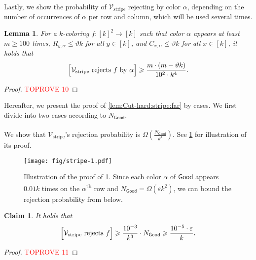 \documentclass[11pt,fleqn]{article}
\renewcommand{\geq}{\geqslant}
\renewcommand{\leq}{\leqslant}
\renewcommand{\epsilon}{\varepsilon}
\renewcommand{\theta}{\vartheta}
\newcommand{\nth}[1]{#1\textsuperscript{th}\xspace}
\newcommand{\V}{\calV}
\newcommand{\f}{f}
\newcommand{\Vstripe}{\V_\mathrm{stripe}}
\newcommand{\Good}{\mathsf{Good}}
\newcommand{\calV}{\mathcal{V}}
\let\Pr\relax\DeclareMathOperator*{\Pr}{\mathbb{P}}
\newtheorem{lemma}[theorem]{Lemma}
\newtheorem{claim}[theorem]{Claim}
\theoremstyle{definition}
\numberwithin{equation}{section}
\begin{document}
Lastly, we show the probability of $\Vstripe$ rejecting by color $\alpha$,
depending on the number of occurrences of $\alpha$ per row and column,
which will be used several times.

\begin{lemma}
\label{clm:Cut-hard:stripe:far:useful}
    For a $k$-coloring $\f \colon [k]^2 \to [k]$ such that
    color $\alpha$ appears at least $m \geq 100$ times,
    $R_{y,\alpha} \leq \theta k$ for all $y \in [k]$, and
    $C_{x,\alpha} \leq \theta k$ for all $x \in [k]$,
    it holds that
    \begin{align}
        \Pr\Bigl[ \Vstripe \text{ rejects } \f \text{ by } \alpha \Bigr]
        \geq \frac{m \cdot (m-\theta k)}{10^2 \cdot k^4}.
    \end{align}
\end{lemma}
\begin{proof}\textcolor{red}{TOPROVE 10}\end{proof}


Hereafter, we present the proof of \cref{lem:Cut-hard:stripe:far} by cases.
We first divide into two cases according to $N_\Good$.


\paragraph{\fbox{(Case 1) $N_\Good \geq 0.01 \epsilon k^2$.}}
We show that $\Vstripe$'s rejection probability is $\Omega\left(\frac{N_\Good}{k^3}\right)$.
See \cref{fig:Cut-hard:stripe:far:1} for illustration of its proof.


\begin{figure}[t]
    \centering
    \texttt{[image: fig/stripe-1.pdf]}
    \caption{
        Illustration of the proof of \cref{clm:Cut-hard:stripe:far:1}.
        Since each color $\alpha$ of $\Good$ appears $0.01k$ times on the \nth{$\alpha$} row and
        $N_\Good = \Omega(\epsilon k^2)$,
        we can bound the rejection probability from below.
    }
    \label{fig:Cut-hard:stripe:far:1}
\end{figure}


\begin{claim}
\label{clm:Cut-hard:stripe:far:1}
    It holds that
    \begin{align}
        \Pr\Bigl[ \Vstripe \text{ rejects } \f \Bigr]
        \geq \frac{10^{-3}}{k^3} \cdot N_\Good
        \geq \frac{10^{-5}\cdot \epsilon}{k}.
    \end{align}
\end{claim}
\begin{proof}\textcolor{red}{TOPROVE 11}\end{proof}
\end{document}
